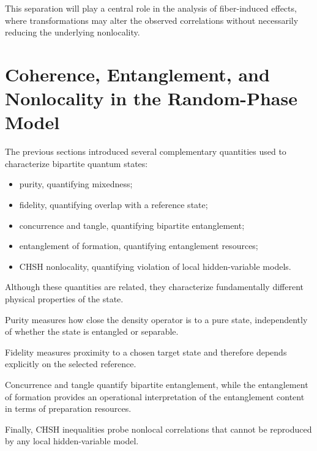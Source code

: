 This separation will play a central role in the analysis of fiber-induced effects, where transformations may alter the observed correlations without necessarily reducing the underlying nonlocality.

\medskip


\section{Coherence, Entanglement, and Nonlocality in the Random-Phase Model}

The previous sections introduced several complementary quantities used to characterize bipartite quantum states:

\begin{itemize}
    \item purity, quantifying mixedness;
    \item fidelity, quantifying overlap with a reference state;
    \item concurrence and tangle, quantifying bipartite entanglement;
    \item entanglement of formation, quantifying entanglement resources;
    \item CHSH nonlocality, quantifying violation of local hidden-variable models.
\end{itemize}

\medskip

Although these quantities are related, they characterize fundamentally different physical properties of the state.

\medskip

Purity measures how close the density operator is to a pure state, independently of whether the state is entangled or separable.

Fidelity measures proximity to a chosen target state and therefore depends explicitly on the selected reference.

Concurrence and tangle quantify bipartite entanglement, while the entanglement of formation provides an operational interpretation of the entanglement content in terms of preparation resources.

Finally, CHSH inequalities probe nonlocal correlations that cannot be reproduced by any local hidden-variable model.

